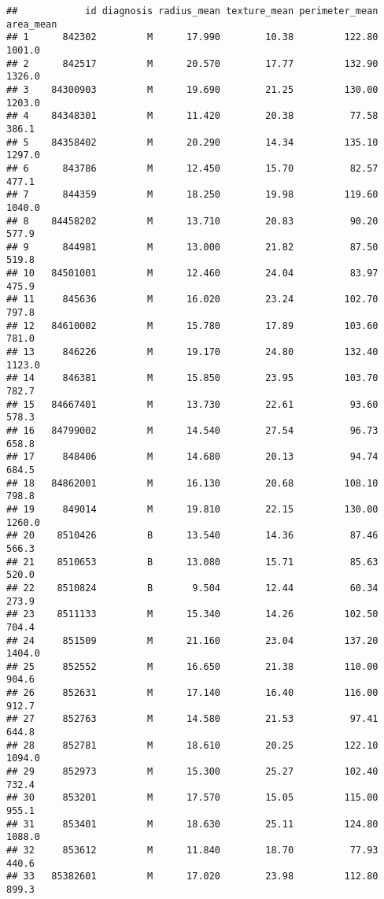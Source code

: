 \documentclass[
]{article}
\begin{document}
\begin{verbatim}
##            id diagnosis radius_mean texture_mean perimeter_mean area_mean
## 1      842302         M      17.990        10.38         122.80    1001.0
## 2      842517         M      20.570        17.77         132.90    1326.0
## 3    84300903         M      19.690        21.25         130.00    1203.0
## 4    84348301         M      11.420        20.38          77.58     386.1
## 5    84358402         M      20.290        14.34         135.10    1297.0
## 6      843786         M      12.450        15.70          82.57     477.1
## 7      844359         M      18.250        19.98         119.60    1040.0
## 8    84458202         M      13.710        20.83          90.20     577.9
## 9      844981         M      13.000        21.82          87.50     519.8
## 10   84501001         M      12.460        24.04          83.97     475.9
## 11     845636         M      16.020        23.24         102.70     797.8
## 12   84610002         M      15.780        17.89         103.60     781.0
## 13     846226         M      19.170        24.80         132.40    1123.0
## 14     846381         M      15.850        23.95         103.70     782.7
## 15   84667401         M      13.730        22.61          93.60     578.3
## 16   84799002         M      14.540        27.54          96.73     658.8
## 17     848406         M      14.680        20.13          94.74     684.5
## 18   84862001         M      16.130        20.68         108.10     798.8
## 19     849014         M      19.810        22.15         130.00    1260.0
## 20    8510426         B      13.540        14.36          87.46     566.3
## 21    8510653         B      13.080        15.71          85.63     520.0
## 22    8510824         B       9.504        12.44          60.34     273.9
## 23    8511133         M      15.340        14.26         102.50     704.4
## 24     851509         M      21.160        23.04         137.20    1404.0
## 25     852552         M      16.650        21.38         110.00     904.6
## 26     852631         M      17.140        16.40         116.00     912.7
## 27     852763         M      14.580        21.53          97.41     644.8
## 28     852781         M      18.610        20.25         122.10    1094.0
## 29     852973         M      15.300        25.27         102.40     732.4
## 30     853201         M      17.570        15.05         115.00     955.1
## 31     853401         M      18.630        25.11         124.80    1088.0
## 32     853612         M      11.840        18.70          77.93     440.6
## 33   85382601         M      17.020        23.98         112.80     899.3

\end{verbatim}
\end{document}
